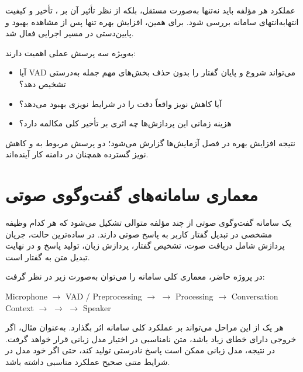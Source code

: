 عملکرد هر مؤلفه باید نه‌تنها به‌صورت مستقل، بلکه از نظر تأثیر
آن بر ، تأخیر و کیفیت انتهابه‌انتهای سامانه بررسی شود.
برای همین، افزایش بهره تنها پس از مشاهده بهبود  و
 پایین‌دستی در مسیر اجرایی فعال شد.

به‌ویژه سه پرسش عملی اهمیت دارند:

\begin{itemize}

    \item آیا VAD می‌تواند شروع و پایان گفتار را بدون حذف
    بخش‌های مهم جمله به‌درستی تشخیص دهد؟

    \item آیا کاهش نویز واقعاً دقت  را در شرایط نویزی
    بهبود می‌دهد؟

    \item هزینه زمانی این پردازش‌ها چه اثری بر تأخیر کلی
    مکالمه دارد؟

\end{itemize}

نتیجه افزایش بهره در فصل آزمایش‌ها گزارش می‌شود؛ دو پرسش مربوط
به  و کاهش نویز گسترده همچنان در دامنه کار آینده‌اند.
\section{معماری سامانه‌های گفت‌وگوی صوتی}

یک سامانه گفت‌وگوی صوتی از چند مؤلفه متوالی تشکیل می‌شود که
هر کدام وظیفه مشخصی در تبدیل گفتار کاربر به پاسخ صوتی دارند.
در ساده‌ترین حالت، جریان پردازش شامل دریافت صوت، تشخیص گفتار،
پردازش زبان، تولید پاسخ و در نهایت تبدیل متن به گفتار است.

در پروژه حاضر، معماری کلی سامانه را می‌توان به‌صورت زیر در نظر گرفت:

\begin{center}
Microphone
$\longrightarrow$
VAD /  Preprocessing
$\longrightarrow$
$\longrightarrow$
 Processing
$\longrightarrow$
Conversation Context
$\longrightarrow$
$\longrightarrow$
$\longrightarrow$
Speaker
\end{center}

هر یک از این مراحل می‌تواند بر عملکرد کلی سامانه اثر بگذارد.
به‌عنوان مثال، اگر خروجی  دارای خطای زیاد باشد، متن
نامناسبی در اختیار مدل زبانی قرار خواهد گرفت.
در نتیجه، مدل زبانی ممکن است پاسخ نادرستی تولید کند، حتی اگر
خود مدل در شرایط متنی صحیح عملکرد مناسبی داشته باشد.

